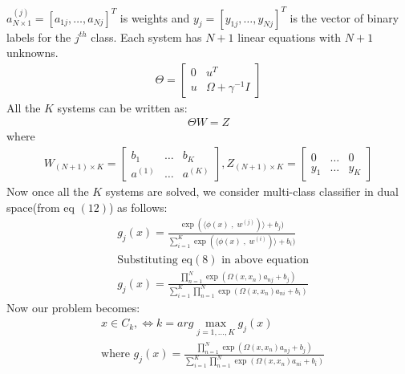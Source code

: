 \documentclass[conference]{IEEEtran}
\begin{document}
    $a^{(j)}_{N \times 1} = [a_{1j}, \ldots, a_{Nj}]^{T}$ is weights and $y_{j} = [y_{1j}, \ldots, y_{Nj}]^{T}$ is the
    vector of binary labels for the $j^{th}$ class.
    Each system has $N+1$ linear equations with $N+1$ unknowns.
    \begin{align}
        \Theta = \begin{bmatrix}
                     0 & u^{T}                 \\
                     u & \Omega + \gamma^{-1}I
        \end{bmatrix}
    \end{align}
    All the $K$ systems can be written as:
    \begin{align}
        \Theta W = Z
    \end{align}
    where
    \begin{align*}
        W_{(N+1) \times K} = \begin{bmatrix}
                                 b_{1}   & \ldots & b_{K}   \\
                                 a^{(1)} & \ldots & a^{(K)}
        \end{bmatrix}
        , Z_{(N+1) \times K} = \begin{bmatrix}
                                   0     & \ldots & 0     \\
                                   y_{1} & \ldots & y_{K}
        \end{bmatrix}
    \end{align*}
    Now once all the $K$ systems are solved, we consider multi-class classifier in dual space(from eq $(12)$) as follows:
    \begin{align*}
        &g_{j}(x) = \frac{\exp(\langle \phi(x)\;,\; w^{(j)})\rangle + b_{j})}{\sum_{i=1}^{K} \exp(\langle \phi(x)\;,\; w^{(i)})\rangle + b_{i})}\\
        &\text{Substituting eq$(8)$ in above equation} \\
        &g_{j}(x) = \frac{\prod_{n=1}^{N}\exp(\Omega(x,x_{n})a_{nj} + b_{j})}{\sum_{i=1}^{K} \prod_{n=1}^{N}\exp(\Omega(x,x_{n})a_{ni} + b_{i})}
    \end{align*}
    Now our problem becomes:
    \begin{align*}
        & x \in C_{k}, \Leftrightarrow k= arg \max_{j=1,\ldots,K} g_{j}(x)\\
        & \text{where } g_{j}(x) = \frac{\prod_{n=1}^{N}\exp(\Omega(x,x_{n})a_{nj} + b_{j})}{\sum_{i=1}^{K} \prod_{n=1}^{N}\exp(\Omega(x,x_{n})a_{ni} + b_{i})}
    \end{align*}
\end{document}
